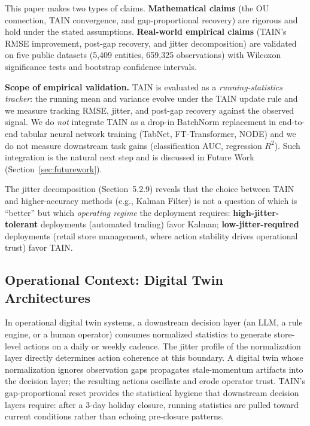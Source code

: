 \documentclass[11pt,a4paper]{article}
\begin{document}
This paper makes two types of claims.
\textbf{Mathematical claims} (the OU connection, TAIN convergence, and
gap-proportional recovery) are rigorous and hold under the stated assumptions.
\textbf{Real-world empirical claims} (TAIN's RMSE improvement, post-gap
recovery, and jitter decomposition) are validated on five public datasets
(5{,}409 entities, 659{,}325 observations) with Wilcoxon significance tests and
bootstrap confidence intervals.

\textbf{Scope of empirical validation.} TAIN is evaluated as a
\emph{running-statistics tracker}: the running mean and variance evolve under
the TAIN update rule and we measure tracking RMSE, jitter, and post-gap recovery
against the observed signal. We do \emph{not} integrate TAIN as a drop-in
BatchNorm replacement in end-to-end tabular neural network training (TabNet,
FT-Transformer, NODE) and we do not measure downstream task gains
(classification AUC, regression $R^2$). Such integration is the natural next
step and is discussed in Future Work (Section~\ref{sec:futurework}).

The jitter decomposition (Section~5.2.9) reveals that the choice between TAIN and
higher-accuracy methods (e.g., Kalman Filter) is not a question of which is
``better'' but which \emph{operating regime} the deployment requires:
\textbf{high-jitter-tolerant} deployments (automated trading) favor Kalman;
\textbf{low-jitter-required} deployments (retail store management, where action
stability drives operational trust) favor TAIN.

\subsection{Operational Context: Digital Twin Architectures}

In operational digital twin systems, a downstream decision layer (an LLM, a
rule engine, or a human operator) consumes normalized statistics to generate
store-level actions on a daily or weekly cadence. The jitter profile of the
normalization layer directly determines action coherence at this boundary. A
digital twin whose normalization ignores observation gaps propagates
stale-momentum artifacts into the decision layer; the resulting actions oscillate
and erode operator trust. TAIN's gap-proportional reset provides the statistical
hygiene that downstream decision layers require: after a 3-day holiday closure,
running statistics are pulled toward current conditions rather than echoing
pre-closure patterns.
\end{document}
